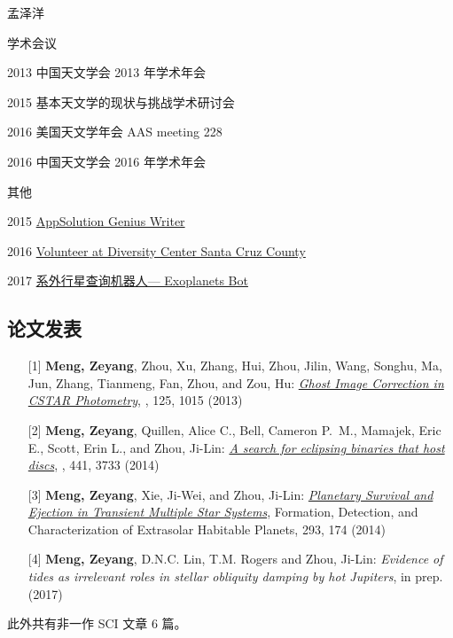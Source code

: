 \begin{resume}
\begin{cv}{\hfill 孟泽洋}
\begin{cvlist}{学术会议}
\item[2013]   中国天文学会 2013 年学术年会
\item[2015]   基本天文学的现状与挑战学术研讨会
\item[2016]   美国天文学年会 AAS meeting 228
\item[2016]   中国天文学会 2016 年学术年会
\end{cvlist}   
\begin{cvlist}{其他}
\setlength{\itemsep}{-0.250\baselineskip plus 0.2em minus 0.2em}
\item[2015]  \href{http://www.ifanr.com/author/meldonization}{AppSolution Genius Writer}
\item[2016] \href{http://www.diversitycenter.org/}{Volunteer at Diversity Center Santa Cruz County}
\item[2017] \href{https://telegram.me/exoplanets_bot}{系外行星查询机器人--- Exoplanets Bot}
\end{cvlist}   
\subsection*{论文发表} 
\begin{itemize}
\item[{[1]}] \textbf{Meng, Zeyang}, Zhou, Xu, Zhang, Hui, Zhou, Jilin, Wang, Songhu, Ma, Jun, Zhang, Tianmeng, Fan, Zhou, and Zou, Hu:  \href{http://adsabs.harvard.edu/abs/2013PASP..125.1015M}{\textit{Ghost Image Correction in CSTAR Photometry}}, \pasp, 125, 1015 (2013) 
\item[{[2]}] \textbf{Meng, Zeyang}, Quillen, Alice C., Bell, Cameron P.~M., Mamajek, Eric E., Scott, Erin L., and Zhou, Ji-Lin:  \href{http://adsabs.harvard.edu/abs/2014MNRAS.441.3733M}{\textit{A search for eclipsing binaries that host discs}}, \mnras, 441, 3733 (2014)  
\item[{[3]}] \textbf{Meng, Zeyang}, Xie, Ji-Wei, and Zhou, Ji-Lin:  \href{http://adsabs.harvard.edu/abs/2014IAUS..293..174M}{\textit{Planetary Survival and Ejection in Transient Multiple Star Systems}}, Formation, Detection, and Characterization of Extrasolar Habitable Planets, 293, 174 (2014) 
\item[{[4]}] \textbf{Meng, Zeyang}, D.N.C. Lin, T.M. Rogers and Zhou, Ji-Lin:  \textit{Evidence of tides as irrelevant roles in stellar obliquity damping by hot Jupiters}, in prep.  (2017)
\end{itemize}
此外共有非一作 SCI 文章 6 篇。\\ 
\vfill
{}
\end{cv}

\end{resume}